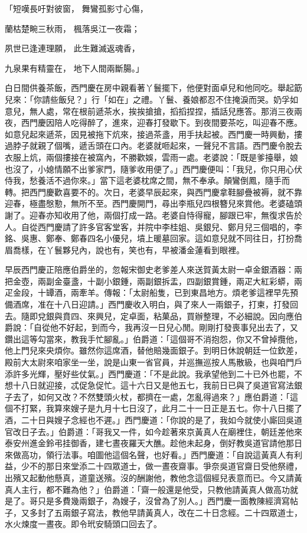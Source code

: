 「短嘆長吁對彼窗，  舞鸞孤影寸心傷，

蘭枯楚畹三秋雨，  楓落吳江一夜霜；

夙世已逢連理願，  此生難滅返魂香，

九泉果有精靈在，  地下人間兩斷腸。」

白日間供養茶飯，西門慶在房中親看著丫鬟擺下，他便對面卓兒和他同吃。舉起筯兒來：「你請些飯兒？」行「如在」之禮。丫鬟、養娘都忍不住掩淚而哭。奶孚如意兒，無人處，常在根前遞茶水，挨挨搶搶，搯搯捏捏，插話兒應答。那消三夜兩夜，西門慶因陪人吃得醉了，進來，迎春打發歇下。到夜間要茶吃，叫迎春不應。如意兒起來遞茶，因見被拖下炕來，接過茶盞，用手扶起被。西門慶一時興動，摟過脖子就親了個嘴，遞舌頭在口內。老婆就咂起來，一聲兒不言語。西門慶令脫去衣服上炕，兩個摟接在被窩內，不勝歡娛，雲雨一處。老婆說：「既是爹擡舉，娘也沒了，小媳情願不出爹家門，隨爹收用便了。」西門慶便叫：「我兒，你只用心伏侍我，愁養活不過你來。」當下這老婆枕席之間，無不奉承。顛鸞倒鳳，隨手而轉。把西門慶歡喜要不的。次日，老婆早辰起來，與西門慶拿鞋腳疊被褥，就不靠迎春，極盡慇懃，無所不至。西門慶開門，尋出李瓶兒四根簪兒來賞他。老婆磕頭謝了。迎春亦知收用了他，兩個打成一路。老婆自恃得寵，腳跟已牢，無復求告於人。自從西門慶請了許多官客堂客，并院中李桂姐、吳銀兒、鄭月兒三個唱的，李銘、吳惠、鄭奉、鄭春四名小優兒，墳上暖墓回家。這如意兒就不同往日，打扮喬眉喬樣，在丫鬟夥兒內，說也有，笑也有，早被潘金蓮看到眼裡。

早辰西門慶正陪應伯爵坐的，忽報宋御史老爹差人來送賀黃太尉一卓金銀酒器：兩把金壺，兩副金臺盞，十副小銀鍾，兩副銀拆盂，四副銀賞鍾，兩疋大紅彩蟒，兩疋金段，十罈酒，兩牽羊。傳報：「太尉船隻，已到東昌地方。煩老爹這裡早先預備酒席，准在十八日迎請。」西門慶收入明白，與了來人一兩銀子，打柬，打發回去。隨即兌銀與賁四、來興兒，定卓面，粘菓品，買辦整理，不必細說。因向應伯爵說：「自從他不好起，到而今，我再沒一日兒心閒。剛剛打發喪事兒出去了，又鑽出這等勾當來，教我手忙腳亂。」伯爵道：「這個哥不消抱怨，你又不曾掉攬他，他上門兒來央煩你。雖然你這席酒，替他賠幾面銀子。到明日休說朝廷一位欽差，殿前大太尉來咱家坐一坐，說是山東一省官員，并巡撫巡按人馬散級，也與咱門戶添許多光輝，壓好些仗氣。」西門慶道：「不是此說。我承望他到二十已外也罷，不想十八日就迎接，忒促急促忙。這十六日又是他五七，我前日已與了吳道官寫法銀子去了，如何又改？不然雙頭火杖，都擠在一處，怎亂得過來？」應伯爵道：「這個不打緊，我算來嫂子是九月十七日沒了，此月二十一日正是五七。你十八日擺了酒，二十日與嫂子念經也不遲。」西門慶道：「你說的是了，我如今就使小廝回吳道官改日子去。」伯爵道：「哥我又一件，如今趁著來京黃真人在廟裡住，朝廷差他來泰安州進金鈴弔挂御香，建七晝夜羅天大醮。趁他未起身，倒好教吳道官請他那日來做高功，領行法事。咱圖他這個名聲，也好看。」西門慶道：「自說這黃真人有利益，少不的那日來堂添二十四眾道士，做一晝夜齋事。爭奈吳道官齋日受他祭禮，出殯又起動他懸真，道童送殯。沒的酬謝他，教他念這個經兒表意而已。今又請黃真人主行，都不難為他？」伯爵道：「齋一般還是他受，只教他請黃真人做高功就是了。哥只是多費幾兩銀子，為嫂子，沒曾為了別人。」西門慶一面教陳經濟寫帖子，又多封了五兩銀子寫法，教他早請黃真人，改在二十日念經。二十四眾道士，水火煉度一晝夜。即令玳安騎頭口回去了。

